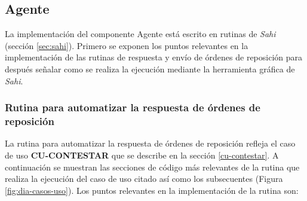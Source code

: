 \subsection{Agente}\label{sec:agente}
La implementación del componente Agente está escrito en rutinas de \textit{Sahi} (sección \ref{sec:sahi}). Primero se exponen los puntos relevantes en la implementación de las rutinas de respuesta y envío de órdenes de reposición para después señalar como se realiza la ejecución mediante la herramienta gráfica de \textit{Sahi}.

\subsubsection{Rutina para automatizar la respuesta de órdenes de reposición}\label{sec:aut-contestar}
La rutina para automatizar la respuesta de órdenes de reposición refleja el caso de uso \textbf{CU-CONTESTAR} que se describe en la sección \ref{cu-contestar}. A continuación se muestran las secciones de código más relevantes de la rutina que realiza la ejecución del caso de uso citado así como los subsecuentes (Figura \ref{fig:dia-casos-uso}). Los puntos relevantes en la implementación de la rutina son:
